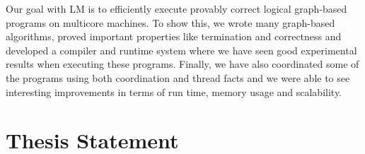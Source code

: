 \iffalse
Since coordination facts are semantically equivalent to
computation and a first class entity of LM, it is still possible to reason about
programs even in the presence of coordination.
\fi

Our goal with LM is to efficiently execute provably correct logical graph-based
programs on multicore machines. To show this, we wrote many graph-based
algorithms, proved important properties like termination and correctness and
developed a compiler and runtime system where we have seen good experimental
results when executing these programs. Finally, we have also coordinated some of
the programs using both coordination and thread facts and we were able to see
interesting improvements in terms of run time, memory usage and scalability.

\section{Thesis Statement}




